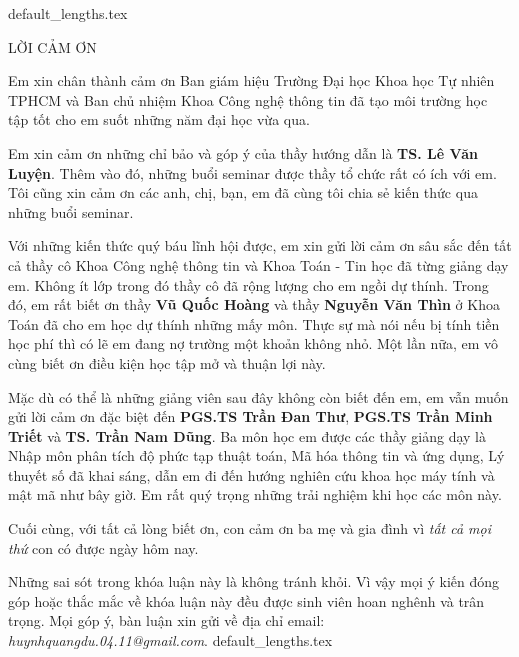 \documentclass[class=report, crop=false]{standalone}
\begin{document}
	{default_lengths.tex}
	\hypertarget{acknowledgements}{}
	\thispagestyle{empty}
	\rmfamily\Large\bfseries
	\begin{center}
		LỜI CẢM ƠN
	\end{center}
	\normalsize\normalfont
	\par\noindent
	Em xin chân thành cảm ơn Ban giám hiệu Trường Đại học Khoa học Tự nhiên TPHCM và Ban chủ nhiệm Khoa Công nghệ thông tin đã tạo môi trường học tập tốt cho em suốt những năm đại học vừa qua.
	
	Em xin cảm ơn những chỉ bảo và góp ý của thầy hướng dẫn là \textbf{TS. Lê Văn Luyện}. Thêm vào đó, những buổi seminar được thầy tổ chức rất có ích với em. Tôi cũng xin cảm ơn các anh, chị, bạn, em đã cùng tôi chia sẻ kiến thức qua những buổi seminar.

	Với những kiến thức quý báu lĩnh hội được, em xin gửi lời cảm ơn sâu sắc đến tất cả thầy cô Khoa Công nghệ thông tin và Khoa Toán - Tin học đã từng giảng dạy em. Không ít lớp trong đó thầy cô đã rộng lượng cho em ngồi dự thính. Trong đó, em rất biết ơn thầy \textbf{Vũ Quốc Hoàng} và thầy \textbf{Nguyễn Văn Thìn} ở Khoa Toán đã cho em học dự thính những mấy môn. Thực sự mà nói nếu bị tính tiền học phí thì có lẽ em đang nợ trường một khoản không nhỏ. Một lần nữa, em vô cùng biết ơn điều kiện học tập mở và thuận lợi này.

	Mặc dù có thể là những giảng viên sau đây không còn biết đến em, em vẫn muốn gửi lời cảm ơn đặc biệt đến \textbf{PGS.TS Trần Đan Thư}, \textbf{PGS.TS Trần Minh Triết} và \textbf{TS. Trần Nam Dũng}. Ba môn học em được các thầy giảng dạy là Nhập môn phân tích độ phức tạp thuật toán, Mã hóa thông tin và ứng dụng, Lý thuyết số đã khai sáng, dẫn em đi đến hướng nghiên cứu khoa học máy tính và mật mã như bây giờ. Em rất quý trọng những trải nghiệm khi học các môn này.

	Cuối cùng, với tất cả lòng biết ơn, con cảm ơn ba mẹ và gia đình vì \emph{tất cả mọi thứ} con có được ngày hôm nay.

	Những sai sót trong khóa luận này là không tránh khỏi. Vì vậy mọi ý kiến đóng góp hoặc thắc mắc về khóa luận này đều được sinh viên hoan nghênh và trân trọng. Mọi góp ý, bàn luận xin gửi về địa chỉ email: \textit{huynhquangdu.04.11@gmail.com}.
	\newpage
	{default_lengths.tex}
\end{document}
